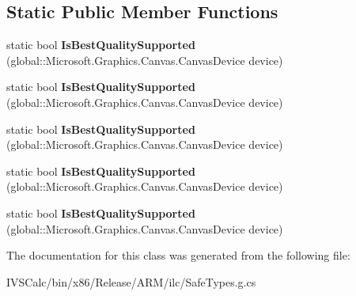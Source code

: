 \subsection*{Static Public Member Functions}
\begin{DoxyCompactItemize}
\item 
\mbox{\label{class_microsoft_1_1_graphics_1_1_canvas_1_1_effects_1_1_color_management_effect_a1054bd04669d83354bb24b62df91cb01}} 
static bool {\bfseries Is\+Best\+Quality\+Supported} (global\+::\+Microsoft.\+Graphics.\+Canvas.\+Canvas\+Device device)
\item 
\mbox{\label{class_microsoft_1_1_graphics_1_1_canvas_1_1_effects_1_1_color_management_effect_a1054bd04669d83354bb24b62df91cb01}} 
static bool {\bfseries Is\+Best\+Quality\+Supported} (global\+::\+Microsoft.\+Graphics.\+Canvas.\+Canvas\+Device device)
\item 
\mbox{\label{class_microsoft_1_1_graphics_1_1_canvas_1_1_effects_1_1_color_management_effect_a1054bd04669d83354bb24b62df91cb01}} 
static bool {\bfseries Is\+Best\+Quality\+Supported} (global\+::\+Microsoft.\+Graphics.\+Canvas.\+Canvas\+Device device)
\item 
\mbox{\label{class_microsoft_1_1_graphics_1_1_canvas_1_1_effects_1_1_color_management_effect_a1054bd04669d83354bb24b62df91cb01}} 
static bool {\bfseries Is\+Best\+Quality\+Supported} (global\+::\+Microsoft.\+Graphics.\+Canvas.\+Canvas\+Device device)
\item 
\mbox{\label{class_microsoft_1_1_graphics_1_1_canvas_1_1_effects_1_1_color_management_effect_a1054bd04669d83354bb24b62df91cb01}} 
static bool {\bfseries Is\+Best\+Quality\+Supported} (global\+::\+Microsoft.\+Graphics.\+Canvas.\+Canvas\+Device device)
\end{DoxyCompactItemize}


The documentation for this class was generated from the following file\+:\begin{DoxyCompactItemize}
\item 
I\+V\+S\+Calc/bin/x86/\+Release/\+A\+R\+M/ilc/Safe\+Types.\+g.\+cs\end{DoxyCompactItemize}
